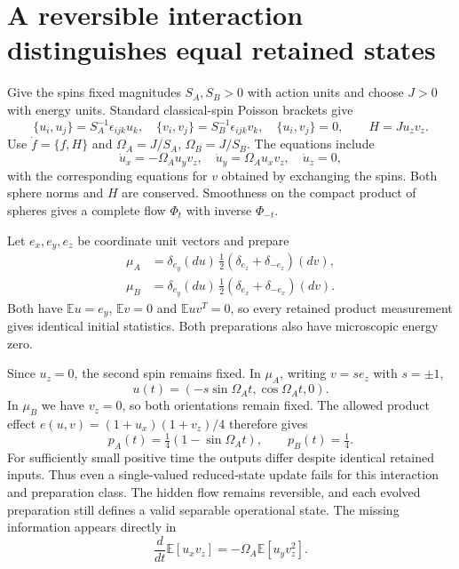 \documentclass[11pt,a4paper]{article}
\newcommand{\E}{\mathbb E}
\begin{document}
\section{A reversible interaction distinguishes equal retained states}
Give the spins fixed magnitudes $S_A,S_B>0$ with action units and choose
$J>0$ with energy units. Standard classical-spin Poisson brackets
\cite{spins} give
\begin{equation}
 \{u_i,u_j\}=S_A^{-1}\epsilon_{ijk}u_k,\quad
 \{v_i,v_j\}=S_B^{-1}\epsilon_{ijk}v_k,\quad\{u_i,v_j\}=0,
 \qquad H=Ju_zv_z.
\end{equation}
Use $\dot f=\{f,H\}$ and $\Omega_A=J/S_A$, $\Omega_B=J/S_B$.
The equations include
\begin{equation}\label{eq:flow}
 \dot u_x=-\Omega_Au_yv_z,\quad\dot u_y=\Omega_Au_xv_z,
 \quad\dot u_z=0,
\end{equation}
with the corresponding equations for $v$ obtained by exchanging the spins.
Both sphere norms and $H$ are conserved. Smoothness on the compact product
of spheres gives a complete flow $\Phi_t$ with inverse $\Phi_{-t}$.

Let $e_x,e_y,e_z$ be coordinate unit vectors and prepare
\begin{align}
 \mu_A&=\delta_{e_y}(du)\,\tfrac12(\delta_{e_z}+\delta_{-e_z})(dv),\\
 \mu_B&=\delta_{e_y}(du)\,\tfrac12(\delta_{e_x}+\delta_{-e_x})(dv).
\end{align}
Both have $\E u=e_y$, $\E v=0$ and $\E uv^T=0$, so every retained
product measurement gives identical initial statistics. Both preparations
also have microscopic energy zero.

Since $u_z=0$, the second spin remains fixed. In $\mu_A$, writing
$v=s e_z$ with $s=\pm1$,
\begin{equation}
 u(t)=(-s\sin\Omega_A t,\cos\Omega_A t,0).
\end{equation}
In $\mu_B$ we have $v_z=0$, so both orientations remain fixed. The allowed
product effect $e(u,v)=(1+u_x)(1+v_z)/4$ therefore gives
\begin{equation}\label{eq:separation}
 p_A(t)=\tfrac14(1-\sin\Omega_A t),\qquad p_B(t)=\tfrac14.
\end{equation}
For sufficiently small positive time the outputs differ despite identical
retained inputs. Thus even a single-valued reduced-state update fails for
this interaction and preparation class. The hidden flow remains reversible,
and each evolved preparation still defines a valid separable operational state.
The missing information appears directly in
\begin{equation}
 \frac{d}{dt}\E[u_xv_z]=-\Omega_A\E[u_yv_z^2].
\end{equation}
\end{document}
